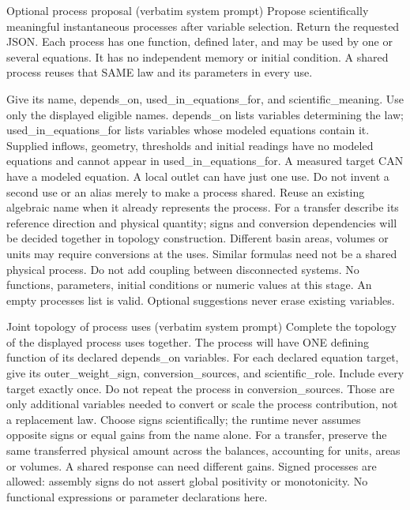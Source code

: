 \begin{afpromptbox}{Optional process proposal (verbatim system prompt)}
Propose scientifically meaningful instantaneous processes after variable
selection. Return the requested JSON. Each process has one function, defined
later, and may be used by one or several equations. It has no independent
memory or initial condition. A shared process reuses that SAME law and its
parameters in every use.

Give its name, depends_on, used_in_equations_for, and scientific_meaning.
Use only the displayed eligible names. depends_on lists variables
determining the law; used_in_equations_for lists variables whose modeled
equations contain it. Supplied inflows, geometry, thresholds and initial
readings have no modeled equations and cannot appear in
used_in_equations_for. A measured target CAN have a modeled equation. A
local outlet can have just one use. Do not invent a second use or an alias
merely to make a process shared. Reuse an existing algebraic name when it
already represents the process. For a transfer describe its reference
direction and physical quantity; signs and conversion dependencies will be
decided together in topology construction. Different basin areas, volumes or
units may require conversions at the uses. Similar formulas need not be a
shared physical process. Do not add coupling between disconnected systems.
No functions, parameters, initial conditions or numeric values at this
stage. An empty processes list is valid. Optional suggestions never erase
existing variables.
\end{afpromptbox}

\begin{afpromptbox}{Joint topology of process uses (verbatim system prompt)}
Complete the topology of the displayed process uses together. The process
will have ONE defining function of its declared depends_on variables. For
each declared equation target, give its outer_weight_sign,
conversion_sources, and scientific_role. Include every target exactly once.
Do not repeat the process in conversion_sources. Those are only additional
variables needed to convert or scale the process contribution, not a
replacement law. Choose signs scientifically; the runtime never assumes
opposite signs or equal gains from the name alone. For a transfer, preserve
the same transferred physical amount across the balances, accounting for
units, areas or volumes. A shared response can need different gains. Signed
processes are allowed: assembly signs do not assert global positivity or
monotonicity. No functional expressions or parameter declarations here.
\end{afpromptbox}

